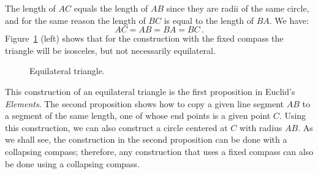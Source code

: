 \documentclass[11pt,a4paper]{article}
\begin{document}
The length of $AC$ equals the length of $AB$ since they are radii of the same circle, and for the same reason the length of $BC$ is equal to the length of $BA$. We have:
\[
AC=AB=BA=BC\,.
\]
Figure~\ref{fig.equilateral} (left) shows that for the construction with the fixed compass the triangle will be isosceles, but not necessarily equilateral.
\begin{figure}[H]
\begin{center}
\caption{Equilateral triangle.}\label{fig.equilateral}
\end{center}
\end{figure}
\vspace*{-4ex}
This construction of an equilateral triangle is the first proposition in Euclid's \emph{Elements}. The second proposition shows how to copy a given line segment $AB$ to a segment of the same length, one of whose end points is a given point $C$. Using this construction, we can also construct a circle centered at $C$ with radius $AB$. As we shall see, the construction in the second proposition can be done with a collapsing compass; therefore, any construction that uses a fixed compass can also be done using a collapsing compass.
\end{document}

